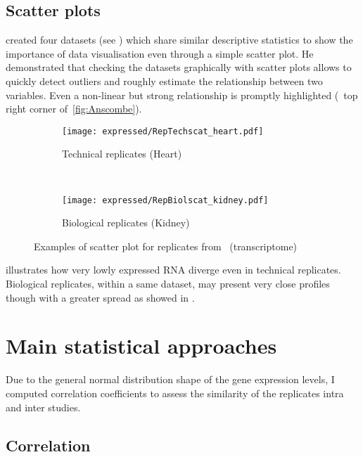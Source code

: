 \subsection{Scatter plots}

\cite{anscombe} created four datasets (see )
which share similar descriptive statistics to show the importance
of data visualisation even through a simple scatter plot.
He demonstrated that checking the datasets graphically with scatter plots
allows to quickly detect outliers and roughly estimate
the relationship between two variables.
Even a non-linear but strong relationship is promptly highlighted
(\eg\ top right corner of~\cref{fig:Anscombe}).

\begin{figure}
    \centering
    \begin{subfigure}[b]{0.48\textwidth}
        \centering \texttt{[image: expressed/RepTechscat\_heart.pdf]}
        \caption{Technical replicates (Heart)}\label{fig:scatTechRep}
    \end{subfigure}~%
    \begin{subfigure}[b]{0.48\textwidth}
    \centering \texttt{[image: expressed/RepBiolscat\_kidney.pdf]}
        \caption{Biological replicates (Kidney)}\label{fig:scatBiolRep}
    \end{subfigure}
    \caption{Examples of scatter plot for replicates from \uhlen\
    (transcriptome)}\label{fig:scatEg}
\end{figure}

 illustrates how very lowly expressed \gls{RNA}
diverge even in technical replicates.
Biological replicates, within a same dataset,
may present very close profiles though with a greater spread
as showed in .


\section{Main statistical approaches}

Due to the general normal distribution shape of the gene expression levels,
I computed correlation coefficients to assess the similarity of the replicates
intra and inter studies.

\subsection{Correlation}

